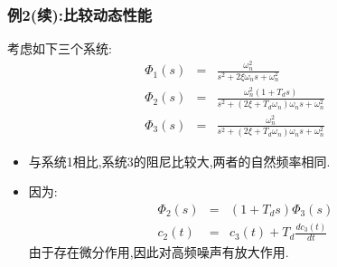 \documentclass{article}
\begin{document}
\begin{frame}
\frametitle{例2(续):比较动态性能}
\label{sec-4-2-3}

考虑如下三个系统:
\begin{eqnarray*}
\Phi_1(s) &=&\frac{\omega_n^2}{s^2+2\xi\omega_n s+\omega_n^2}\\
\Phi_2(s) &=&\frac{\omega_n^2(1+T_d s) }{s^2+(2\xi+T_d\omega_n)\omega_n s+\omega_n^2}\\
\Phi_3(s) &=&\frac{\omega_n^2}{s^2+(2\xi+T_d\omega_n)\omega_n s+\omega_n^2}
\end{eqnarray*}           

\begin{itemize}
\item <2->与系统1相比,系统3的阻尼比较大,两者的自然频率相同.
\item <3->因为:
        \begin{eqnarray*}
        \Phi_2(s) & = & (1+T_d s)\Phi_3(s) \\
        c_2(t) &=& c_3(t)+T_d\frac{dc_3(t)}{dt}
        \end{eqnarray*}
       由于存在微分作用,因此对高频噪声有放大作用.
\end{itemize}
\end{frame}
\end{document}
